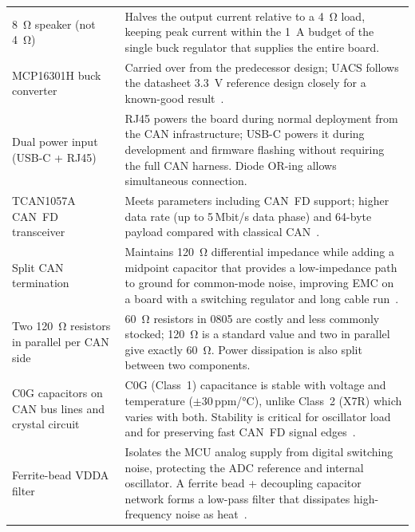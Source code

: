 \begin{longtable}{p{} p{}}
  \SI{8}{\ohm} speaker (not \SI{4}{\ohm})
    & Halves the output current relative to a \SI{4}{\ohm} load, keeping
      peak current within the \SI{1}{\ampere} budget of the single buck
      regulator that supplies the entire board. \\[4pt]

  MCP16301H buck converter
    & Carried over from the predecessor design; UACS follows the
      datasheet \SI{3.3}{\volt} reference design closely for a
      known-good result~\cite{ref2}. \\[4pt]

  Dual power input (USB-C + RJ45)
    & RJ45 powers the board during normal deployment from the CAN
      infrastructure; USB-C powers it during development and firmware
      flashing without requiring the full CAN harness. Diode OR-ing
      allows simultaneous connection. \\[4pt]

  TCAN1057A CAN~FD transceiver
    & Meets parameters including CAN~FD support; higher data rate
      (up to 5\,Mbit/s data phase) and 64-byte payload compared with
      classical CAN~\cite{ref14,ref15}. \\[4pt]

  Split CAN termination
    & Maintains \SI{120}{\ohm} differential impedance while adding a
      midpoint capacitor that provides a low-impedance path to ground
      for common-mode noise, improving EMC on a board with a switching
      regulator and long cable run~\cite{ref16,ref17,ref18}. \\[4pt]

  Two \SI{120}{\ohm} resistors in parallel per CAN side
    & \SI{60}{\ohm} resistors in 0805 are costly and less commonly
      stocked; \SI{120}{\ohm} is a standard value and two in parallel
      give exactly \SI{60}{\ohm}. Power dissipation is also split
      between two components. \\[4pt]

  C0G capacitors on CAN bus lines and crystal circuit
    & C0G (Class~1) capacitance is stable with voltage and temperature
      ($\pm30$\,ppm/°C), unlike Class~2 (X7R) which varies with both.
      Stability is critical for oscillator load and for preserving fast
      CAN~FD signal edges~\cite{ref19,ref20}. \\[4pt]

  Ferrite-bead VDDA filter
    & Isolates the MCU analog supply from digital switching noise,
      protecting the ADC reference and internal oscillator. A ferrite
      bead + decoupling capacitor network forms a low-pass filter that
      dissipates high-frequency noise as heat~\cite{ref21}. \\[4pt]


\end{longtable}

